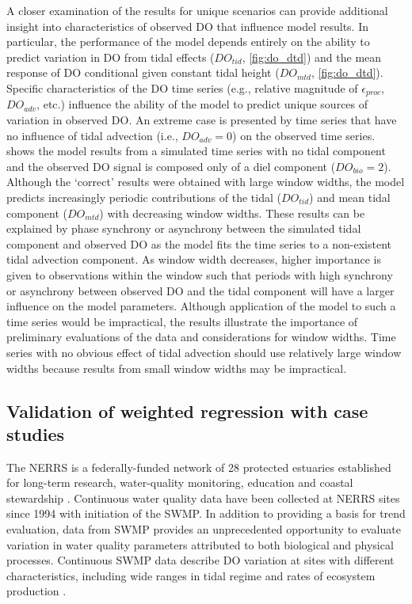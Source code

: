 \documentclass[letterpaper,12pt,oneside]{article}\usepackage[]{graphicx}\usepackage[]{color}
\begin{document}
A closer examination of the results for unique scenarios can provide additional insight into characteristics of observed \ac{DO} that influence model results.  In particular, the performance of the model depends entirely on the ability to predict variation in \ac{DO} from tidal effects ($DO_{tid}$, \cref{fig:do_dtd}) and the mean response of \ac{DO} conditional given constant tidal height ($DO_{mtd}$, \cref{fig:do_dtd}).  Specific characteristics of the \ac{DO} time series (e.g., relative magnitude of $\epsilon_{proc}$, $DO_{adv}$, etc.) influence the ability of the model to predict unique sources of variation in observed \ac{DO}.  An extreme case is presented by time series that have no influence of tidal advection (i.e., $DO_{adv} = 0$) on the observed time series.   shows the model results from a simulated time series with no tidal component and the observed \ac{DO} signal is composed only of a diel component ($DO_{bio} = 2$).  Although the `correct' results were obtained with large window widths, the model predicts increasingly periodic contributions of the tidal ($DO_{tid}$) and mean tidal component ($DO_{mtd}$) with decreasing window widths.  These results can be explained by phase synchrony or asynchrony between the simulated tidal component and observed \ac{DO} as the model fits the time series to a non-existent tidal advection component.  As window width decreases, higher importance is given to observations within the window such that periods with high synchrony or asynchrony between observed \ac{DO} and the tidal component will have a larger influence on the model parameters.  Although application of the model to such a time series would be impractical, the results illustrate the importance of preliminary evaluations of the data and considerations for window widths.  Time series with no obvious effect of tidal advection should use relatively large window widths because results from small window widths may be impractical.  
 
\subsection{Validation of weighted regression with case studies}

The \ac{NERRS} is a federally-funded network of 28 protected estuaries established for long-term research, water-quality monitoring, education and coastal stewardship \citep{Wenner04}.  Continuous water quality data have been collected at \ac{NERRS} sites since 1994 with initiation of the \ac{SWMP}.  In addition to providing a basis for trend evaluation, data from \ac{SWMP} provides an unprecedented opportunity to evaluate variation in water quality parameters attributed to both biological and physical processes.  Continuous \ac{SWMP} data describe \ac{DO} variation at sites with different characteristics, including wide ranges in tidal regime \citep{Sanger02} and rates of ecosystem production \citep{Caffrey03}.  
\end{document}
